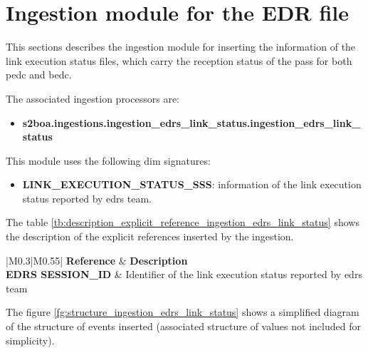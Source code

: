 \section{Ingestion module for the EDR file}

This sections describes the ingestion module for inserting the information of the link execution status files, which carry the reception status of the pass for both \acrshort{pedc} and \acrshort{bedc}.

The associated ingestion processors are:

\begin{itemize} 

\item \textbf{s2boa.ingestions.ingestion\_edrs\_link\_status.ingestion\_edrs\_link\_status}
  
\end{itemize}

This module uses the following \acrshort{dim} signatures:

\begin{itemize} 

\item \textbf{LINK\_EXECUTION\_STATUS\_SSS}: information of the link execution status reported by \acrshort{edrs} team.
  
\end{itemize}

The table \ref{tb:description_explicit_reference_ingestion_edrs_link_status} shows the description of the explicit references inserted by the ingestion.

\begin{longtable}{|M{0.3\linewidth}|M{0.55\linewidth}|}
\hline \textbf{Reference} & \textbf{Description} \\ \hline
\textbf{EDRS SESSION\_ID} & Identifier of the link execution status reported by \acrshort{edrs} team \\ \hline
\caption{Table describing the explicit reference associated to the ingestion}
\label{tb:description_explicit_reference_ingestion_edrs_link_status}
\end{longtable}

The figure \ref{fg:structure_ingestion_edrs_link_status} shows a simplified diagram of the structure of events inserted (associated structure of values not included for simplicity).

